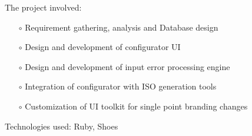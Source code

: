 \documentclass{scrartcl}
\begin{document}
\begin{cv}{
\href{http://www.develmj.com}{}
}
{\begin{itemize}
    The project involved:
    {\scriptsize
  \begin{itemize}
  \item[\footnotesize$\circ$] Requirement gathering, analysis and Database design
  \item[\footnotesize$\circ$] Design and development of configurator UI
  \item[\footnotesize$\circ$] Design and development of input error processing engine
  \item[\footnotesize$\circ$] Integration of configurator with ISO generation tools
  \item[\footnotesize$\circ$] Customization of UI toolkit for single
    point branding changes
  \end{itemize}}
  Technologies used: Ruby, Shoes
\end{itemize}
}

\vspace{0.5em}


\end{cv}
\end{document}
